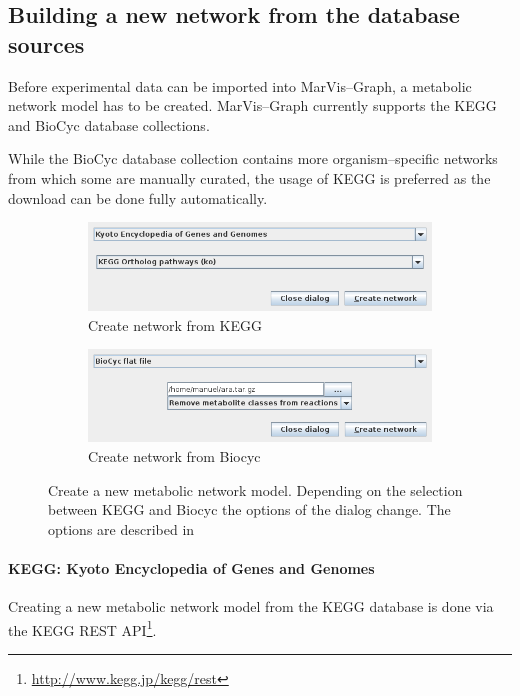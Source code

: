 \documentclass[titlepage,a4paper,twoside]{article}
\newcommand{\mg}{MarVis--Graph\xspace}
\newcommand{\pref}[1]{\prettyref{#1}}
\begin{document}
\subsection{Building a new network from the database sources}

Before experimental data can be imported into \mg, a metabolic network model
has to be created. \mg currently supports the KEGG and BioCyc database
collections.

While the BioCyc database collection contains more organism--specific networks
from which some are manually curated, the usage of KEGG is preferred as the
download can be done fully automatically.

\begin{figure}
	\begin{subfigure}[b]{0.45\textwidth}
		\includegraphics[width=\textwidth]{images/create_network_kegg.png}
		\caption{Create network from KEGG\label{fig:newnetwork_kegg}}
	\end{subfigure}
	\begin{subfigure}[b]{0.45\textwidth}
		\includegraphics[width=\textwidth]{images/create_network_biocyc.png}
		\caption{Create network from Biocyc\label{fig:newnetwork_biocyc}}
	\end{subfigure}

	\caption[Create new network]{Create a new metabolic network model.
		Depending on the selection between KEGG and Biocyc the options of the
	dialog change. The options are described in \pref{ssec:newnetwork}
	\label{fig:newnetwork}}
\end{figure}

\paragraph{KEGG: Kyoto Encyclopedia of Genes and Genomes}
\cite{kanehisa2010kegg,kanehisa2000kegg} Creating a new metabolic network
model from the KEGG database is done via the KEGG REST
API\footnote{\url{http://www.kegg.jp/kegg/rest}}. 
\end{document}

